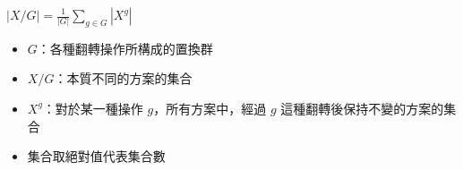 $|X/G| = \frac{1}{|G|} \sum_{g\in G} |X^g|$
\begin{itemize}
    \item $G$：各種翻轉操作所構成的置換群
    \item $X/G$：本質不同的方案的集合
    \item $X^g$：對於某一種操作 $g$，所有方案中，經過 $g$ 這種翻轉後保持不變的方案的集合
    \item 集合取絕對值代表集合數
\end{itemize}